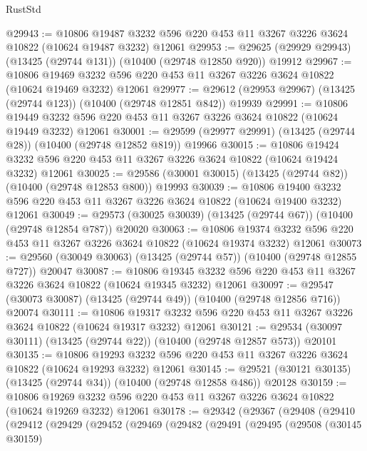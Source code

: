 \begin{lexlean}{RustStd}
\begin{coremodule}
@29943 := @10806
    @19487
    @3232
    @596
    @220
    @453
    @11
    @3267
    @3226
    @3624
    @10822
    (@10624 @19487 @3232)
    @12061
@29953 := @29625 (@29929 @29943) (@13425 (@29744 @131)) (@10400 (@29748 @12850 @920)) @19912
@29967 := @10806
    @19469
    @3232
    @596
    @220
    @453
    @11
    @3267
    @3226
    @3624
    @10822
    (@10624 @19469 @3232)
    @12061
@29977 := @29612 (@29953 @29967) (@13425 (@29744 @123)) (@10400 (@29748 @12851 @842)) @19939
@29991 := @10806
    @19449
    @3232
    @596
    @220
    @453
    @11
    @3267
    @3226
    @3624
    @10822
    (@10624 @19449 @3232)
    @12061
@30001 := @29599 (@29977 @29991) (@13425 (@29744 @28)) (@10400 (@29748 @12852 @819)) @19966
@30015 := @10806
    @19424
    @3232
    @596
    @220
    @453
    @11
    @3267
    @3226
    @3624
    @10822
    (@10624 @19424 @3232)
    @12061
@30025 := @29586 (@30001 @30015) (@13425 (@29744 @82)) (@10400 (@29748 @12853 @800)) @19993
@30039 := @10806
    @19400
    @3232
    @596
    @220
    @453
    @11
    @3267
    @3226
    @3624
    @10822
    (@10624 @19400 @3232)
    @12061
@30049 := @29573 (@30025 @30039) (@13425 (@29744 @67)) (@10400 (@29748 @12854 @787)) @20020
@30063 := @10806
    @19374
    @3232
    @596
    @220
    @453
    @11
    @3267
    @3226
    @3624
    @10822
    (@10624 @19374 @3232)
    @12061
@30073 := @29560 (@30049 @30063) (@13425 (@29744 @57)) (@10400 (@29748 @12855 @727)) @20047
@30087 := @10806
    @19345
    @3232
    @596
    @220
    @453
    @11
    @3267
    @3226
    @3624
    @10822
    (@10624 @19345 @3232)
    @12061
@30097 := @29547 (@30073 @30087) (@13425 (@29744 @49)) (@10400 (@29748 @12856 @716)) @20074
@30111 := @10806
    @19317
    @3232
    @596
    @220
    @453
    @11
    @3267
    @3226
    @3624
    @10822
    (@10624 @19317 @3232)
    @12061
@30121 := @29534 (@30097 @30111) (@13425 (@29744 @22)) (@10400 (@29748 @12857 @573)) @20101
@30135 := @10806
    @19293
    @3232
    @596
    @220
    @453
    @11
    @3267
    @3226
    @3624
    @10822
    (@10624 @19293 @3232)
    @12061
@30145 := @29521 (@30121 @30135) (@13425 (@29744 @34)) (@10400 (@29748 @12858 @486)) @20128
@30159 := @10806
    @19269
    @3232
    @596
    @220
    @453
    @11
    @3267
    @3226
    @3624
    @10822
    (@10624 @19269 @3232)
    @12061
@30178 := @29342
    (@29367
      (@29408
        (@29410
          (@29412
            (@29429
              (@29452
                (@29469
                  (@29482
                    (@29491
                      (@29495
                        (@29508
                          (@30145 @30159)

\end{coremodule}
\end{lexlean}
